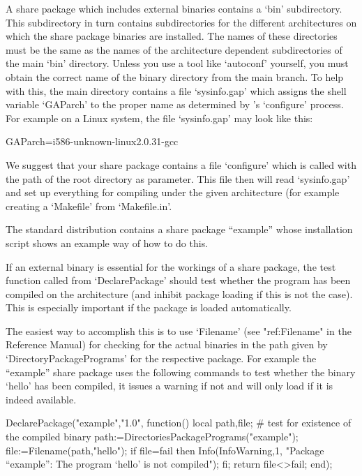 A share package  which includes external binaries contains a `bin'
subdirectory. This subdirectory in turn contains subdirectories for
the different architectures on which the share package binaries are
installed.  The names of these directories must be the same as the
names of the architecture dependent subdirectories of the main `bin'
directory. Unless you use a tool like `autoconf' yourself, you must
obtain the correct name of the binary directory from the main {\GAP}
branch. To help with this, the main {\GAP} directory contains a file
`sysinfo.gap' which assigns the shell variable `GAParch' to the proper
name as determined by {\GAP}'s `configure' process. For example on a
Linux system, the file `sysinfo.gap' may  look like this:

\begintt
GAParch=i586-unknown-linux2.0.31-gcc
\endtt

We suggest that your share package contains a file `configure' which
is  called with the  path of  the  {\GAP} root directory  as
parameter. This file then  will  read `sysinfo.gap' and set  up
everything for compiling under the given architecture (for example
creating a `Makefile' from `Makefile.in'.

The standard {\GAP} distribution contains a share package ``example''
whose installation script shows an example way of how to do this.


If an external binary is essential for the  workings of a share package, the
test function called  from `DeclarePackage' should test whether the program
has been compiled on the architecture (and inhibit package loading if this
is not the case). This is especially important if the package is loaded
automatically.

The easiest way to accomplish this is to use `Filename' (see "ref:Filename"
in the Reference Manual) for checking for  the actual binaries in the path
given by `DirectoryPackagePrograms'  for the respective package. For example
the ``example'' share package uses the following commands to test whether
the binary `hello' has been compiled, it issues a warning if not and will
only load if it is indeed available.

\begintt
DeclarePackage("example","1.0",
  function()
  local path,file;
    # test for existence of the compiled binary
    path:=DirectoriesPackagePrograms("example");
    file:=Filename(path,"hello");
    if file=fail then
      Info(InfoWarning,1,
        "Package ``example'': The program `hello' is not compiled");
    fi;
    return file<>fail;
  end);
\endtt

